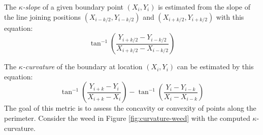 \documentclass[letterpaper]{report}
\begin{document}
{The \textit{$\kappa$-slope} of a given boundary point $(X_i, Y_i)$ is estimated from the slope of the line joining positions $(X_{i-k/2}, Y_{i-k/2})$ and $(X_{i+k/2}, Y_{i+k/2})$ with this equation:
\begin{equation}
\tan^{-1}\left(\frac{Y_{i+k/2} - Y_{i-k/2}}{X_{i+k/2} - X_{i-k/2}}\right)
\end{equation}
 
 The \textit{$\kappa$-curvature} of the boundary at location $(X_i,Y_i)$ can be estimated by this equation:
 \begin{equation}
 \tan^{-1}\left(\frac{Y_{i+k} - Y_{i}}{X_{i+k} - X_{i}}\right) - \tan^{-1}\left(\frac{Y_{i} - Y_{i-k}}{X_{i} - X_{i-k} }\right)
 \end{equation}
 The goal of this metric is to assess the concavity or convexity of points along the perimeter. Consider the weed in Figure \ref{fig:curvature-weed} with the computed $\kappa$-curvature.
 
}
\end{document}
